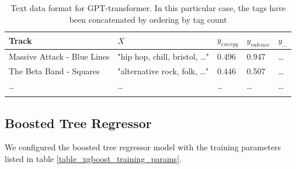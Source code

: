 \documentclass[sn-mathphys]{sn-jnl}%
\theoremstyle{thmstyleone}%
\theoremstyle{thmstyletwo}%
\theoremstyle{thmstylethree}%
\begin{document}
\begin{table}[h]
      \begin{center}
      \begin{minipage}{\textwidth}
      \caption{Text data format for GPT-transformer. In this particular case, the tags have been concatenated by ordering by tag count}\label{text_format}%
      \begin{tabular}{@{}lllll@{}}
      \toprule
      Track                         & $X$                                   & $y_{energy}$ & $y_{valence}$ & $y_{\dots}$ \\
      \midrule
      Massive Attack - Blue Lines   & "hip hop, chill, bristol, \dots"      & 0.496        & 0.947         & \dots  \\
      The Beta Band - Squares       & "alternative rock, folk, \dots"       & 0.446        & 0.507         & \dots \\
      \dots                         & \dots                                 & \dots        & \dots         & \dots  \\
      \botrule
      \end{tabular}
      \end{minipage}
      \end{center}
\end{table}




\subsection{Boosted Tree Regressor}

We configured the boosted tree regressor model with the training parameters listed in table \ref{table_xgboost_training_params}.
\end{document}
